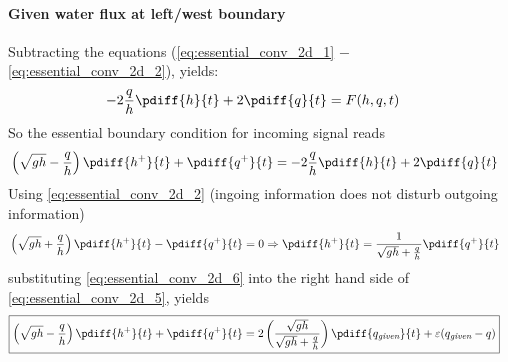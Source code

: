 \paragraph*{Given water flux at left/west boundary}
Subtracting the equations (\eqref{eq:essential_conv_2d_1} $-$ \eqref{eq:essential_conv_2d_2}), yields:
\begin{align}
    - 2 \frac{q}{h}\pdiff{h}{t}  + 2 \pdiff{q}{t} & =  F(h, q, t)
\end{align}
So the essential boundary condition for incoming signal reads
\begin{align}
    & \left(\sqrt{gh} - \frac{q}{h}\right) \pdiff{h^{+}}{t} + \pdiff{q^{+}}{t} =
    - 2 \frac{q}{h}\pdiff{h}{t}  + 2 \pdiff{q}{t} \label{eq:essential_conv_2d_5}
\end{align}
Using \autoref{eq:essential_conv_2d_2} (ingoing information does not disturb outgoing information)
\begin{align}
    &\left(\sqrt{gh} + \frac{q}{h}\right) \pdiff{h^{+}}{t} - \pdiff{q^{+}}{t} = 0
    \Rightarrow
    \pdiff{h^{+}}{t}   =
    \frac{1}{\sqrt{gh} + \frac{q}{h}}\pdiff{q^{+}}{t}\label{eq:essential_conv_2d_6}
\end{align}
substituting \autoref{eq:essential_conv_2d_6} into the right hand side of \autoref{eq:essential_conv_2d_5}, yields
\begin{align}
    &{\boxed{
            \left(\sqrt{gh} - \frac{q}{h}\right) \pdiff{h^{+}}{t} + \pdiff{q^{+}}{t} =
            2 \left( \frac{\sqrt{gh}}{\sqrt{gh} + \frac{q}{h}} \right)\pdiff{q_{\textit{given}}}{t} + \eps(q_{\textit{given}} - q)
    }}\label{eq:essential_bc_2d_q}
\end{align}
